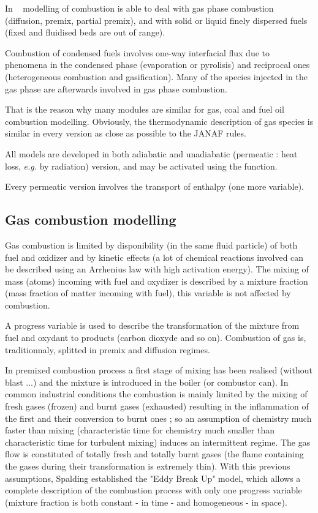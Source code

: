 In \CS~ modelling of combustion is able to deal with gas phase combustion
(diffusion, premix, partial premix), and with solid or liquid finely dispersed
fuels (fixed and fluidised beds are out of range).

Combustion of condensed fuels involves one-way interfacial flux due to phenomena in the condensed phase (evaporation or pyrolisis) and reciprocal ones
(heterogeneous combustion and gasification). Many of the species injected in the gas phase are afterwards involved in
gas phase combustion.

That is the reason why many modules are similar for gas, coal and fuel oil
combustion modelling. Obviously, the thermodynamic description of gas
species is similar in every version as close as possible to the JANAF rules.

All models are developed in both adiabatic and unadiabatic (permeatic : heat
loss, \emph{e.g.} by radiation) version, and may be activated
using the  function.

Every permeatic version involves the transport of enthalpy (one more variable).

\subsection{Gas combustion modelling}

Gas combustion is limited by disponibility (in the same fluid particle) of both
fuel and oxidizer and by kinetic effects (a lot of chemical reactions involved
can be described using an Arrhenius law with high activation energy). The mixing of mass (atoms) incoming with fuel and oxydizer is described by a mixture
fraction (mass fraction of matter incoming with fuel), this
variable is not affected by combustion.

A progress variable is used to describe the transformation of the mixture from
fuel and oxydant to products (carbon dioxyde and so on).
Combustion of gas is, traditionnaly, splitted in premix and diffusion regimes.

In premixed combustion process a first stage of mixing has been realised
(without blast ...) and the mixture is introduced in the boiler (or combustor
can). In common industrial conditions the combustion is mainly limited by the
mixing of fresh gases (frozen) and burnt gases (exhausted) resulting in the
inflammation of the first and their conversion to burnt ones ; so an assumption
of chemistry much faster than mixing (characteristic time for chemistry much
smaller than characteristic time for turbulent mixing) induces an intermittent
regime. The gas flow is constituted of totally fresh and totally burnt gases
(the flame containing the gases during their transformation is extremely
thin). With this previous assumptions, Spalding \cite{Spalding:1971a} established the "Eddy
Break Up" model, which allows a complete description of the combustion process
with only one progress variable (mixture fraction is both constant
- in time - and homogeneous - in space).

